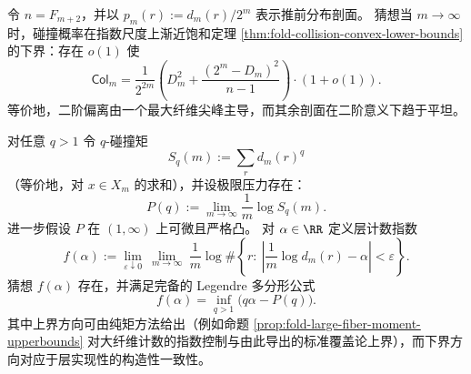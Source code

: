 \begin{conjecture}\label{conj:fold-col-spike-flat-saturation}
令 \(n=F_{m+2}\)，并以 \(p_m(r):=d_m(r)/2^m\) 表示推前分布剖面。
猜想当 \(m\to\infty\) 时，碰撞概率在指数尺度上渐近饱和定理 \ref{thm:fold-collision-convex-lower-bounds} 的下界：存在 \(o(1)\) 使
\[
\mathsf{Col}_m
=\frac{1}{2^{2m}}\left(D_m^2+\frac{(2^m-D_m)^2}{n-1}\right)\cdot(1+o(1)).
\]
等价地，二阶偏离由一个最大纤维尖峰主导，而其余剖面在二阶意义下趋于平坦。
\end{conjecture}

\begin{conjecture}\label{conj:fold-multifractal-legendre-completeness}
对任意 \(q>1\) 令 \(q\)-碰撞矩
\[
S_q(m):=\sum_{r} d_m(r)^q
\]
（等价地，对 \(x\in X_m\) 的求和），并设极限压力存在：
\[
P(q):=\lim_{m\to\infty}\frac{1}{m}\log S_q(m).
\]
进一步假设 \(P\) 在 \((1,\infty)\) 上可微且严格凸。
对 \(\alpha\in\RR\) 定义层计数指数
\[
f(\alpha):=\lim_{\varepsilon\downarrow 0}\ \lim_{m\to\infty}\ \frac{1}{m}\log
\#\left\{r:\ \left|\frac{1}{m}\log d_m(r)-\alpha\right|<\varepsilon\right\}.
\]
猜想 \(f(\alpha)\) 存在，并满足完备的 Legendre 多分形公式
\[
\boxed{\;
f(\alpha)=\inf_{q>1}\bigl(q\alpha-P(q)\bigr). \;}
\]
其中上界方向可由纯矩方法给出（例如命题 \ref{prop:fold-large-fiber-moment-upperbounds} 对大纤维计数的指数控制与由此导出的标准覆盖论上界），而下界方向对应于层实现性的构造性一致性。
\end{conjecture}

\endinput
